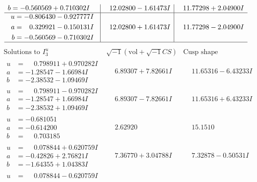 \documentclass[1p]{elsarticle_modified}
\theoremstyle{definition}
\newcommand{\I}{\sqrt{-1}}
\begin{document}
$$\begin{array}{c|c|c}
\begin{aligned}
b &= -0.560569 + 0.710302 I\end{aligned}
 & \phantom{-}12.02800 - 1.61473 I & \phantom{-}11.77298 + 2.04900 I \\ \hline\begin{aligned}
u &= -0.806430 - 0.927777 I \\
a &= \phantom{-}0.329921 - 0.150131 I \\
b &= -0.560569 - 0.710302 I\end{aligned}
 & \phantom{-}12.02800 + 1.61473 I & \phantom{-}11.77298 - 2.04900 I\\
 \hline 
 \end{array}$$\newpage$$\begin{array}{c|c|c}  
\text{Solutions to }I^u_{3}& \I (\text{vol} + \sqrt{-1}CS) & \text{Cusp shape}\\
 \hline 
\begin{aligned}
u &= \phantom{-}0.798911 + 0.970282 I \\
a &= -1.28547 - 1.66984 I \\
b &= -2.38532 - 1.09469 I\end{aligned}
 & \phantom{-}6.89307 + 7.82661 I & \phantom{-}11.65316 - 6.43233 I \\ \hline\begin{aligned}
u &= \phantom{-}0.798911 - 0.970282 I \\
a &= -1.28547 + 1.66984 I \\
b &= -2.38532 + 1.09469 I\end{aligned}
 & \phantom{-}6.89307 - 7.82661 I & \phantom{-}11.65316 + 6.43233 I \\ \hline\begin{aligned}
u &= -0.681051\phantom{ +0.000000I} \\
a &= -0.614200\phantom{ +0.000000I} \\
b &= \phantom{-}0.703185\phantom{ +0.000000I}\end{aligned}
 & \phantom{-}2.62920\phantom{ +0.000000I} & \phantom{-}15.1510\phantom{ +0.000000I} \\ \hline\begin{aligned}
u &= \phantom{-}0.078844 + 0.620759 I \\
a &= -0.42826 + 2.76821 I \\
b &= -1.64355 + 1.04383 I\end{aligned}
 & \phantom{-}7.36770 + 3.04788 I & \phantom{-}7.32878 - 0.50531 I \\ \hline\begin{aligned}
u &= \phantom{-}0.078844 - 0.620759 I \\

\end{aligned}
\end{array}$$
\end{document}
